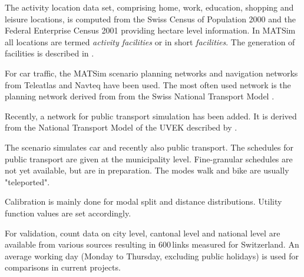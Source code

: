 The activity location data set, comprising home, work, education, shopping and leisure locations, is computed from the Swiss Census of Population 2000 and the Federal Enterprise Census 2001 \citep[][]{SwissEnterpriseCensus_manual_2001} providing hectare level information. In MATSim all locations are termed \emph{activity facilities} or in short \emph{facilities}. The generation of facilities is described in \citet[][p.33]{BalmerEtAl_ResRep_bdktzrh_2009}.

For car traffic, the MATSim scenario planning networks and navigation networks from Teleatlas \citep[][]{MultiNet_Webpage_2010} and Navteq \citep[][]{Navteq_2011} have been used. The most often used network is the planning network derived from from the Swiss National Transport Model \citep[][]{VrticEtAl_BiegerEtAl_2003}.

Recently, a network for public transport simulation has been added. It is derived from the National Transport Model of the UVEK described by \citet[][]{VrticFroehlich_ResRep_UVEK_2010}. 

The scenario simulates car and recently also public transport. The schedules for public transport are given at the municipality level. Fine-granular schedules are not yet available, but are in preparation. The modes walk and bike are usually "teleported". 

Calibration is mainly done for modal split and distance distributions. Utility function values are set accordingly.

For validation, count data on city level, cantonal level and national level \citep[][]{ASTRA_Webpage_2006} are available from various sources resulting in 600\,links measured for Switzerland. An average working day (Monday to Thursday, excluding public holidays) is used for comparisons in current projects.

